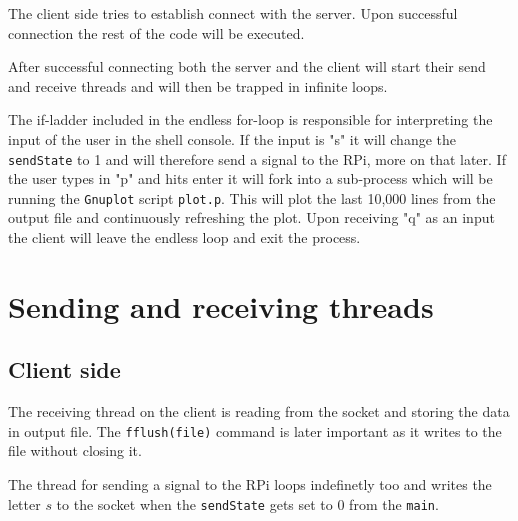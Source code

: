 \documentclass[12pt,paper=a4,twoside]{scrartcl}
\numberwithin{equation}{section}
\begin{document}


The client side tries to establish connect with the server. Upon successful connection the rest of the code will be executed.


After successful connecting both the server and the client will start their send and receive threads and will then be trapped in infinite loops.


The if-ladder included in the endless for-loop is responsible for interpreting the input of the user in the shell console. If the input is "s" it will change the \verb+sendState+ to 1 and will therefore send a signal to the RPi, more on that later. If the user types in "p" and hits enter it will fork into a sub-process which will be running the \verb+Gnuplot+ script \verb+plot.p+. This will plot the last 10,000 lines from the output file and continuously refreshing the plot. Upon receiving "q" as an input the client will leave the endless loop and exit the process.


\section{Sending and receiving threads}
\subsection{Client side}
The receiving thread on the client is reading from the socket and storing the data in output file. The \verb+fflush(file)+ command is later important as it writes to the file without closing it.

The thread for sending a signal to the RPi loops indefinetly too and writes the letter $s$ to the socket when the \verb+sendState+ gets set to 0 from the \verb+main+.

\end{document}
